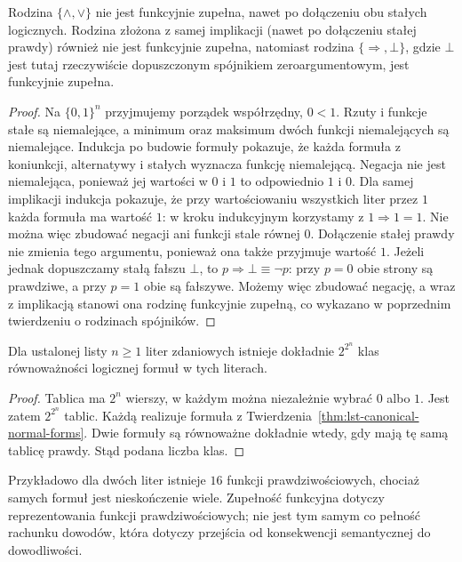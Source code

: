 \begin{stwierdzenie}
\label{prop:lst-incomplete-connectives}
Rodzina $\{\land,\lor\}$ nie jest funkcyjnie zupełna,
nawet po dołączeniu obu stałych logicznych.
Rodzina złożona z samej implikacji (nawet po dołączeniu
stałej prawdy) również nie jest funkcyjnie zupełna,
natomiast rodzina $\{\Rightarrow,\bot\}$, gdzie $\bot$
jest tutaj rzeczywiście dopuszczonym spójnikiem
zeroargumentowym, jest funkcyjnie zupełna.
\end{stwierdzenie}
\begin{proof}
Na $\{0,1\}^n$ przyjmujemy porządek współrzędny,
$0<1$. Rzuty i funkcje stałe są niemalejące,
a minimum oraz maksimum dwóch funkcji niemalejących
są niemalejące. Indukcja po budowie formuły
pokazuje, że każda formuła z koniunkcji,
alternatywy i stałych wyznacza funkcję niemalejącą.
Negacja nie jest niemalejąca, ponieważ jej wartości
w $0$ i $1$ to odpowiednio $1$ i $0$.
Dla samej implikacji indukcja pokazuje, że przy
wartościowaniu wszystkich liter przez $1$ każda
formuła ma wartość $1$: w kroku indukcyjnym
korzystamy z $1\Rightarrow1=1$. Nie można więc
zbudować negacji ani funkcji stale równej $0$.
Dołączenie stałej prawdy nie zmienia tego argumentu,
ponieważ ona także przyjmuje wartość $1$.
Jeżeli jednak dopuszczamy stałą fałszu $\bot$, to
$p\Rightarrow\bot\equiv\neg p$: przy $p=0$ obie strony
są prawdziwe, a przy $p=1$ obie są fałszywe.
Możemy więc zbudować negację, a wraz z implikacją
stanowi ona rodzinę funkcyjnie zupełną, co wykazano
w poprzednim twierdzeniu o rodzinach spójników.
\end{proof}

\begin{wniosek}
\label{cor:lst-boolean-function-count}
Dla ustalonej listy $n\geq1$ liter zdaniowych istnieje
dokładnie $2^{2^n}$ klas równoważności logicznej formuł
w tych literach.
\end{wniosek}
\begin{proof}
Tablica ma $2^n$ wierszy, w każdym można niezależnie
wybrać $0$ albo $1$. Jest zatem $2^{2^n}$ tablic.
Każdą realizuje formuła z
Twierdzenia~\ref{thm:lst-canonical-normal-forms}.
Dwie formuły są równoważne dokładnie wtedy, gdy
mają tę samą tablicę prawdy. Stąd podana liczba klas.
\end{proof}
Przykładowo dla dwóch liter istnieje $16$ funkcji
prawdziwościowych, chociaż samych formuł jest
nieskończenie wiele. Zupełność funkcyjna dotyczy
reprezentowania funkcji prawdziwościowych; nie jest
tym samym co pełność rachunku dowodów, która dotyczy
przejścia od konsekwencji semantycznej do dowodliwości.

